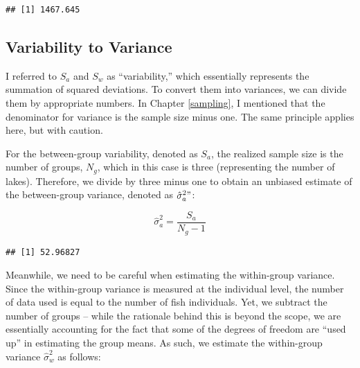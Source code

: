 \documentclass[
]{book}
\newenvironment{Shaded}{\begin{snugshade}}{\end{snugshade}}
\newcommand{\CommentTok}[1]{\textcolor[rgb]{0.56,0.35,0.01}{\textit{#1}}}
\newcommand{\DecValTok}[1]{\textcolor[rgb]{0.00,0.00,0.81}{#1}}
\newcommand{\FunctionTok}[1]{\textcolor[rgb]{0.00,0.00,0.00}{#1}}
\newcommand{\NormalTok}[1]{#1}
\newcommand{\OtherTok}[1]{\textcolor[rgb]{0.56,0.35,0.01}{#1}}
\newcommand{\SpecialCharTok}[1]{\textcolor[rgb]{0.00,0.00,0.00}{#1}}
\begin{document}
\begin{verbatim}
## [1] 1467.645
\end{verbatim}

\hypertarget{variability-to-variance}{%
\subsection{Variability to Variance}\label{variability-to-variance}}

I referred to \(S_a\) and \(S_w\) as ``variability,'' which essentially represents the summation of squared deviations. To convert them into variances, we can divide them by appropriate numbers. In Chapter \ref{sampling}, I mentioned that the denominator for variance is the sample size minus one. The same principle applies here, but with caution.

For the between-group variability, denoted as \(S_a\), the realized sample size is the number of groups, \(N_g\), which in this case is three (representing the number of lakes). Therefore, we divide by three minus one to obtain an unbiased estimate of the between-group variance, denoted as \(\hat{\sigma}_a^2"\):

\[
\hat{\sigma}^2_a = \frac{S_a}{N_g-1}
\]

\begin{Shaded}
\end{Shaded}

\begin{verbatim}
## [1] 52.96827
\end{verbatim}

Meanwhile, we need to be careful when estimating the within-group variance. Since the within-group variance is measured at the individual level, the number of data used is equal to the number of fish individuals. Yet, we subtract the number of groups -- while the rationale behind this is beyond the scope, we are essentially accounting for the fact that some of the degrees of freedom are ``used up'' in estimating the group means. As such, we estimate the within-group variance \(\hat{\sigma}^2_w\) as follows:
\end{document}
